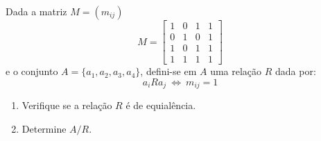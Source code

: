 \item Dada a matriz $M=(m_{ij})$
\[ 
M=\begin{bmatrix}
1&0&1&1 \\0&1&0&1 \\1&0&1&1 \\ 1&1&1&1
\end{bmatrix}
\]
e o conjunto $A=\{a_1,a_2,a_3,a_4\}$, defini-se em $A$ uma relação $R$ dada por:
\[
a_iRa_j\ \Leftrightarrow\   m_{ij}=1
\] 
\begin{enumerate}
  \item Verifique se a relação $R$ é de equialência.
  \item Determine $A/R$.
\end{enumerate}
